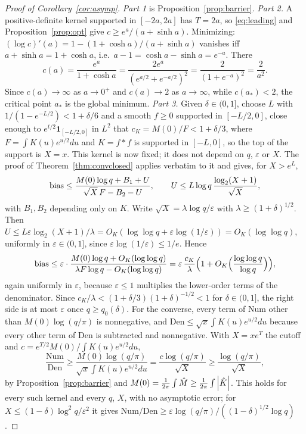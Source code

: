 \begin{proof}[Proof of Corollary~\ref{cor:asymp}]
\emph{Part 1} is Proposition~\ref{prop:barrier}. \emph{Part 2.} A positive-definite kernel supported in $[-2a,2a]$ has $T=2a$, so
\eqref{eq:leading} and Proposition~\ref{prop:opt} give $c\ge e^a/(a+\sinh a)$. Minimizing:
$(\log c)'(a)=1-(1+\cosh a)/(a+\sinh a)$ vanishes iff $a+\sinh a=1+\cosh a$, i.e.\ $a-1=\cosh a-\sinh a=e^{-a}$. There
\[
  c(a)=\frac{e^a}{1+\cosh a}=\frac{2e^a}{(e^{a/2}+e^{-a/2})^2}=\frac2{(1+e^{-a})^2}=\frac2{a^2}.
\]
Since $c(a)\to\infty$ as $a\to0^+$ and $c(a)\to2$ as $a\to\infty$, while $c(a_*)<2$, the critical point $a_*$ is the global
minimum. \emph{Part 3.} Given $\delta\in(0,1]$, choose $L$ with $1/(1-e^{-L/2})<1+\delta/6$ and a smooth $f\ge0$ supported in
$[-L/2,0]$, close enough to $e^{t/2}\mathbf 1_{[-L/2,0]}$ in $L^2$ that $c_K=M(0)/F<1+\delta/3$, where $F=\int K(u)e^{u/2}du$ and
$K=f*f$ is supported in $[-L,0]$, so the top of the support is $X=x$. This kernel is now fixed; it does not depend on $q$, $\varepsilon$ or
$X$. The proof of Theorem~\ref{thm:convclosed} applies verbatim to it and gives, for $X>e^{L}$,
\[
  \operatorname{bias}\le\frac{M(0)\log q+B_1+U}{\sqrt X\,F-B_2-U},\qquad U\le L\log q\,\frac{\log_2(X+1)}{\sqrt X},
\]
with $B_1,B_2$ depending only on $K$. Write $\sqrt X=\lambda\log q/\varepsilon$ with $\lambda\ge(1+\delta)^{1/2}$. Then
$U\le L\varepsilon\log_2(X+1)/\lambda=O_K(\log\log q+\varepsilon\log(1/\varepsilon))=O_K(\log\log q)$, uniformly in $\varepsilon\in(0,1]$, since
$\varepsilon\log(1/\varepsilon)\le1/e$. Hence
\[
  \operatorname{bias}\le\varepsilon\cdot\frac{M(0)\log q+O_K(\log\log q)}{\lambda F\log q-O_K(\log\log q)}
  =\varepsilon\,\frac{c_K}{\lambda}\Bigl(1+O_K\Bigl(\frac{\log\log q}{\log q}\Bigr)\Bigr),
\]
again uniformly in $\varepsilon$, because $\varepsilon\le1$ multiplies the lower-order terms of the denominator. Since
$c_K/\lambda<(1+\delta/3)(1+\delta)^{-1/2}<1$ for $\delta\in(0,1]$, the right side is at most $\varepsilon$ once $q\ge q_0(\delta)$. For the converse, every term of $\mathrm{Num}$ other than $M(0)\log(q/\pi)$ is nonnegative, and $\mathrm{Den}\le\sqrt x\int K(u)e^{u/2}du$
because every other term of $\mathrm{Den}$ is subtracted and nonnegative. With $X=xe^{T}$ the cutoff and $c=e^{T/2}M(0)/\int K(u)e^{u/2}du$,
\[
  \frac{\mathrm{Num}}{\mathrm{Den}}\ge\frac{M(0)\log(q/\pi)}{\sqrt x\int K(u)e^{u/2}du}=\frac{c\log(q/\pi)}{\sqrt X}\ge\frac{\log(q/\pi)}{\sqrt X},
\]
by Proposition~\ref{prop:barrier} and $M(0)=\frac1{2\pi}\int\hat M\ge\frac1{2\pi}\int\left\lvert \hat K \right\rvert$. This holds for every such kernel and every $q$, $X$,
with no asymptotic error; for $X\le(1-\delta)\log^2q/\varepsilon^2$ it gives $\mathrm{Num}/\mathrm{Den}\ge\varepsilon\log(q/\pi)/((1-\delta)^{1/2}\log q)$.
\end{proof}

